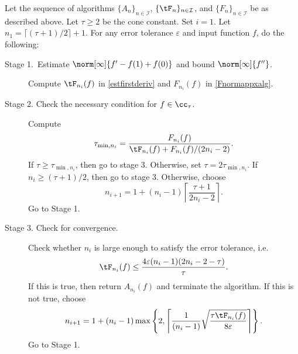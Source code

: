 \begin{algo} \label{multistageapproalgo}
Let the sequence of algorithms $\{A_n\}_{n\in \mathcal{I}}$, $\{\tF_n\}_{n\in \mathcal{I}}$, and $\{F_n\}_{n\in \mathcal{I}}$ be as described above.
Let $\tau \ge 2$ be the cone constant. Set $i=1$. Let $n_1=\lceil(\tau+1)/2\rceil+1$. For any error tolerance $\varepsilon$ and input function $f$, do the following:
\begin{description}
\item[Stage 1.\ Estimate {$\norm[\infty]{f'-f(1)+f(0)}$} and bound {$\norm[\infty]{f''}$}.] Compute $\tF_{n_i}(f)$ in \eqref{estfirstderiv} and $F_{n_i}(f)$ in \eqref{Fnormappxalg}.

\item[Stage 2. Check the necessary condition for $f \in \cc_{\tau}$.] Compute
    \begin{align*}
     \tau_{\min,n_i} =  \frac{F_{n_i}(f)}{\tF_{n_i}(f)+F_{n_i}(f)/(2n_i-2)}.
    \end{align*}
If $\tau \ge \tau_{\min,n_i}$, then go to stage 3.  Otherwise, set $\tau = 2\tau_{\min,n_i}$.  If $n_i \ge (\tau+1)/2$, then go to stage 3.  Otherwise, choose
$$
n_{i+1}=1+ (n_i-1)\left\lceil\frac{\tau+1}{2n_i-2}\right\rceil.
$$
Go to Stage 1.

\item[Stage 3. Check for convergence.] Check whether $n_i$ is large enough to satisfy the error tolerance, i.e.
    \begin{equation*}
     \tF_{n_i}(f) \le \frac{4\varepsilon(n_i-1)(2n_i-2 - \tau)}{\tau}.
    \end{equation*}
If this is true, then return $A_{n_i}(f)$ and terminate the algorithm.   If this is not true, choose
$$
n_{i+1}=1+ (n_i-1)\max\left\{2,\left\lceil\frac{1}{(n_i-1)}\sqrt{\frac{\tau \tF_{n_i}(f)}{8\varepsilon}}\right\rceil\right\}.
$$
Go to Stage 1.
\end{description}
\end{algo}

